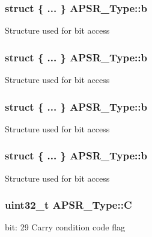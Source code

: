 \subsubsection[{\texorpdfstring{b}{b}}]{\setlength{\rightskip}{0pt plus 5cm}struct \{ ... \}   A\+P\+S\+R\+\_\+\+Type\+::b}\hypertarget{union_a_p_s_r___type_a250681ece58cf12233f316edea344e75}{}\label{union_a_p_s_r___type_a250681ece58cf12233f316edea344e75}
Structure used for bit access 
\subsubsection[{\texorpdfstring{b}{b}}]{\setlength{\rightskip}{0pt plus 5cm}struct \{ ... \}   A\+P\+S\+R\+\_\+\+Type\+::b}\hypertarget{union_a_p_s_r___type_a4de9553e1a179b9f95ed77b23e177951}{}\label{union_a_p_s_r___type_a4de9553e1a179b9f95ed77b23e177951}
Structure used for bit access 
\subsubsection[{\texorpdfstring{b}{b}}]{\setlength{\rightskip}{0pt plus 5cm}struct \{ ... \}   A\+P\+S\+R\+\_\+\+Type\+::b}\hypertarget{union_a_p_s_r___type_ae073581a9037182a0f0c54a93a857592}{}\label{union_a_p_s_r___type_ae073581a9037182a0f0c54a93a857592}
Structure used for bit access 
\subsubsection[{\texorpdfstring{b}{b}}]{\setlength{\rightskip}{0pt plus 5cm}struct \{ ... \}   A\+P\+S\+R\+\_\+\+Type\+::b}\hypertarget{union_a_p_s_r___type_acb547d8b76d2f9ed5c35aec568cf2e55}{}\label{union_a_p_s_r___type_acb547d8b76d2f9ed5c35aec568cf2e55}
Structure used for bit access 
\subsubsection[{\texorpdfstring{C}{C}}]{\setlength{\rightskip}{0pt plus 5cm}uint32\+\_\+t A\+P\+S\+R\+\_\+\+Type\+::C}\hypertarget{union_a_p_s_r___type_a86e2c5b891ecef1ab55b1edac0da79a6}{}\label{union_a_p_s_r___type_a86e2c5b891ecef1ab55b1edac0da79a6}
bit\+: 29 Carry condition code flag 
